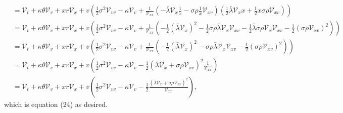 \documentclass[11pt]{article}
\numberwithin{equation}{section}
\begin{document}
\begin{equation*}
\begin{aligned}
        &= \mathcal{V}_t + \kappa \theta \mathcal{V}_v + x r \mathcal{V}_x + v \left( \frac{1}{2} \sigma^2 \mathcal{V}_{vv} - \kappa \mathcal{V}_v + \frac{1}{\mathcal{V}_{xx}} \left( -\bar{\lambda} \mathcal{V}_x \frac{1}{x} - \sigma \rho \frac{1}{x} \mathcal{V}_{xv} \right) \left ( \frac{1}{2} \bar{\lambda} \mathcal{V}_{x}x + \frac{1}{2} x \sigma \rho \mathcal{V}_{xv} \right) \right) \\
        &= \mathcal{V}_t + \kappa \theta \mathcal{V}_v + x r \mathcal{V}_x + v \left( \frac{1}{2} \sigma^2 \mathcal{V}_{vv} - \kappa \mathcal{V}_v + \frac{1}{\mathcal{V}_{xx}} \left( - \frac{1}{2} \left( \bar{\lambda} \mathcal{V}_x \right)^2 - \frac{1}{2} \sigma \rho \bar{\lambda} \mathcal{V}_x \mathcal{V}_{xv} - \frac{1}{2} \bar{\lambda} \sigma \rho \mathcal{V}_x \mathcal{V}_{xv} - \frac{1}{2} \left( \sigma \rho \mathcal{V}_{xv} \right)^2 \right) \right) \\
        &= \mathcal{V}_t + \kappa \theta \mathcal{V}_v + x r \mathcal{V}_x + v \left( \frac{1}{2} \sigma^2 \mathcal{V}_{vv} - \kappa \mathcal{V}_v + \frac{1}{\mathcal{V}_{xx}} \left( - \frac{1}{2} \left( \bar{\lambda} \mathcal{V}_x \right)^2 - \sigma \rho \bar{\lambda} \mathcal{V}_x \mathcal{V}_{xv} - \frac{1}{2} \left( \sigma \rho \mathcal{V}_{xv} \right)^2 \right) \right) \\
        &= \mathcal{V}_t + \kappa \theta \mathcal{V}_v + x r \mathcal{V}_x + v \left( \frac{1}{2} \sigma^2 \mathcal{V}_{vv} - \kappa \mathcal{V}_v - \frac{1}{2} \left( \bar{\lambda} \mathcal{V}_x + \sigma \rho \mathcal{V}_{xv} \right)^2 \frac{1}{\mathcal{V}_{xx}} \right)\\
        &=\mathcal{V}_t + \kappa \theta \mathcal{V}_v + x r \mathcal{V}_x + v \left( \frac{1}{2} \sigma^2 \mathcal{V}_{vv} - \kappa \mathcal{V}_v - \frac{1}{2} \frac{\left( \bar{\lambda} \mathcal{V}_x + \sigma \rho \mathcal{V}_{xv} \right)^2}{\mathcal{V}_{xx}} \right),
        \end{aligned}
\end{equation*}
which is equation (24) as desired.
\end{document}
